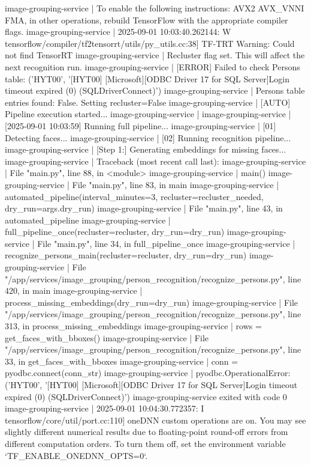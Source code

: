image-grouping-service  | To enable the following instructions: AVX2 AVX_VNNI FMA, in other operations, rebuild TensorFlow with the appropriate compiler flags.
image-grouping-service  | 2025-09-01 10:03:40.262144: W tensorflow/compiler/tf2tensorrt/utils/py_utils.cc:38] TF-TRT Warning: Could not find TensorRT
image-grouping-service  | Recluster flag set. This will affect the next recognition run.
image-grouping-service  | [ERROR] Failed to check Persons table: ('HYT00', '[HYT00] [Microsoft][ODBC Driver 17 for SQL Server]Login timeout expired (0) (SQLDriverConnect)')
image-grouping-service  | Persons table entries found: False. Setting recluster=False
image-grouping-service  | [AUTO] Pipeline execution started...
image-grouping-service  |
image-grouping-service  | [2025-09-01 10:03:59] Running full pipeline...
image-grouping-service  | [01] Detecting faces...
image-grouping-service  | [02] Running recognition pipeline...
image-grouping-service  | [Step 1:] Generating embeddings for missing faces...
image-grouping-service  | Traceback (most recent call last):
image-grouping-service  |   File "main.py", line 88, in <module>
image-grouping-service  |     main()
image-grouping-service  |   File "main.py", line 83, in main
image-grouping-service  |     automated_pipeline(interval_minutes=3, recluster=recluster_needed, dry_run=args.dry_run)
image-grouping-service  |   File "main.py", line 43, in automated_pipeline
image-grouping-service  |     full_pipeline_once(recluster=recluster, dry_run=dry_run)
image-grouping-service  |   File "main.py", line 34, in full_pipeline_once
image-grouping-service  |     recognize_persons_main(recluster=recluster, dry_run=dry_run)
image-grouping-service  |   File "/app/services/image_grouping/person_recognition/recognize_persons.py", line 420, in main
image-grouping-service  |     process_missing_embeddings(dry_run=dry_run)
image-grouping-service  |   File "/app/services/image_grouping/person_recognition/recognize_persons.py", line 313, in process_missing_embeddings
image-grouping-service  |     rows = get_faces_with_bboxes()
image-grouping-service  |   File "/app/services/image_grouping/person_recognition/recognize_persons.py", line 33, in get_faces_with_bboxes
image-grouping-service  |     conn = pyodbc.connect(conn_str)
image-grouping-service  | pyodbc.OperationalError: ('HYT00', '[HYT00] [Microsoft][ODBC Driver 17 for SQL Server]Login timeout expired (0) (SQLDriverConnect)')
image-grouping-service exited with code 0
image-grouping-service  | 2025-09-01 10:04:30.772357: I tensorflow/core/util/port.cc:110] oneDNN custom operations are on. You may see slightly different numerical results due to floating-point round-off errors from different computation orders. To turn them off, set the environment variable `TF_ENABLE_ONEDNN_OPTS=0`.
